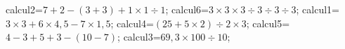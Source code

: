 \documentclass[exercice]{thedocument}%
\begin{document}
%
    \>calcul2=$7+2-(3+3)+1\times1\div1$;%
    \>calcul6=$3\times3\times3\div3\div3\div3$;%
    \>calcul1=$3\times3+6\times4,5-7\times1,5$;%
    \>calcul4=$(25+5\times2)\div2\times3$;%
    \>calcul5=$4-3+5+3-(10-7)$;%
    \>calcul3=$69,3\times100\div10$;%
\end{document}

